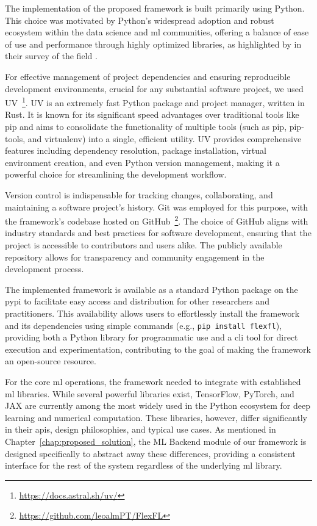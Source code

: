 The implementation of the proposed framework is built primarily using Python. This choice was motivated by Python's widespread adoption and robust ecosystem within the data science and \ac{ml} communities, offering a balance of ease of use and performance through highly optimized libraries, as highlighted by \citeauthor{raschka2020machine} in their survey of the field \cite{raschka2020machine}.

For effective management of project dependencies and ensuring reproducible development environments, crucial for any substantial software project, we used UV~\footnote{\url{https://docs.astral.sh/uv/}}. UV is an extremely fast Python package and project manager, written in Rust. It is known for its significant speed advantages over traditional tools like pip and aims to consolidate the functionality of multiple tools (such as pip, pip-tools, and virtualenv) into a single, efficient utility. UV provides comprehensive features including dependency resolution, package installation, virtual environment creation, and even Python version management, making it a powerful choice for streamlining the development workflow. 

Version control is indispensable for tracking changes, collaborating, and maintaining a software project's history. Git was employed for this purpose, with the framework's codebase hosted on GitHub~\footnote{\url{https://github.com/leoalmPT/FlexFL}}. The choice of GitHub aligns with industry standards and best practices for software development, ensuring that the project is accessible to contributors and users alike. The publicly available repository allows for transparency and community engagement in the development process.

The implemented framework is available as a standard Python package on the \ac{pypi} to facilitate easy access and distribution for other researchers and practitioners. This availability allows users to effortlessly install the framework and its dependencies using simple commands (e.g., \texttt{pip install flexfl}), providing both a Python library for programmatic use and a \ac{cli} tool for direct execution and experimentation, contributing to the goal of making the framework an open-source resource.

For the core \ac{ml} operations, the framework needed to integrate with established \ac{ml} libraries. While several powerful libraries exist, TensorFlow, PyTorch, and JAX are currently among the most widely used in the Python ecosystem for deep learning and numerical computation. These libraries, however, differ significantly in their \acp{api}, design philosophies, and typical use cases. As mentioned in Chapter~\ref{chap:proposed_solution}, the ML Backend module of our framework is designed specifically to abstract away these differences, providing a consistent interface for the rest of the system regardless of the underlying \ac{ml} library. 

